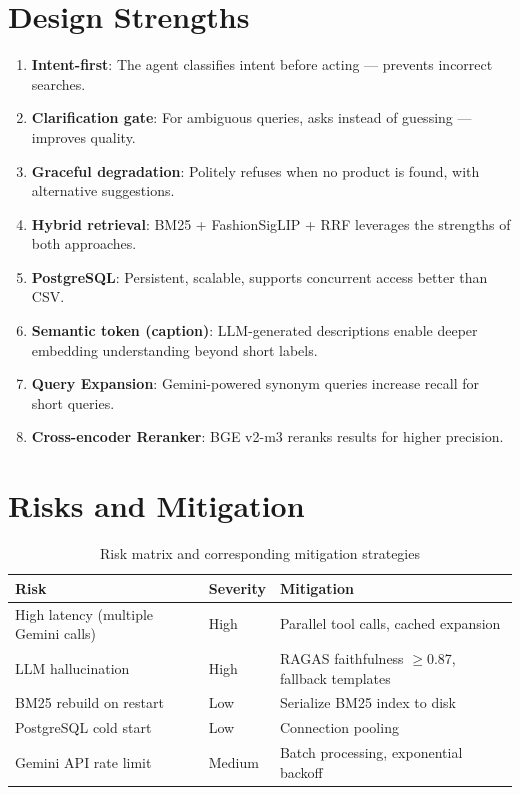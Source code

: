 \documentclass[12pt, twoside]{report}
\begin{document}
\section{Design Strengths}
\begin{enumerate}
    \item \textbf{Intent-first}: The agent classifies intent before acting --- prevents incorrect searches.
    \item \textbf{Clarification gate}: For ambiguous queries, asks instead of guessing --- improves quality.
    \item \textbf{Graceful degradation}: Politely refuses when no product is found, with alternative suggestions.
    \item \textbf{Hybrid retrieval}: BM25 + FashionSigLIP + RRF leverages the strengths of both approaches.
    \item \textbf{PostgreSQL}: Persistent, scalable, supports concurrent access better than CSV.
    \item \textbf{Semantic token (caption)}: LLM-generated descriptions enable deeper embedding understanding beyond short labels.
    \item \textbf{Query Expansion}: Gemini-powered synonym queries increase recall for short queries.
    \item \textbf{Cross-encoder Reranker}: BGE v2-m3 reranks results for higher precision.
\end{enumerate}

\section{Risks and Mitigation}

\begin{table}[H]
\centering
\begin{tabular}{lll}
\toprule
\textbf{Risk} & \textbf{Severity} & \textbf{Mitigation}\\
\midrule
High latency (multiple Gemini calls) & High   & Parallel tool calls, cached expansion\\
LLM hallucination                    & High   & RAGAS faithfulness $\geq$0.87, fallback templates\\
BM25 rebuild on restart              & Low    & Serialize BM25 index to disk\\
PostgreSQL cold start                & Low    & Connection pooling\\
Gemini API rate limit                & Medium & Batch processing, exponential backoff\\
\bottomrule
\end{tabular}
\caption{Risk matrix and corresponding mitigation strategies}
\end{table}
\end{document}
